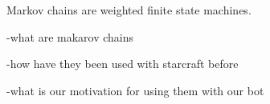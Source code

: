 Markov chains are weighted finite state machines.


-what are makarov chains

-how have they been used with starcraft before

-what is our motivation for using them with our bot